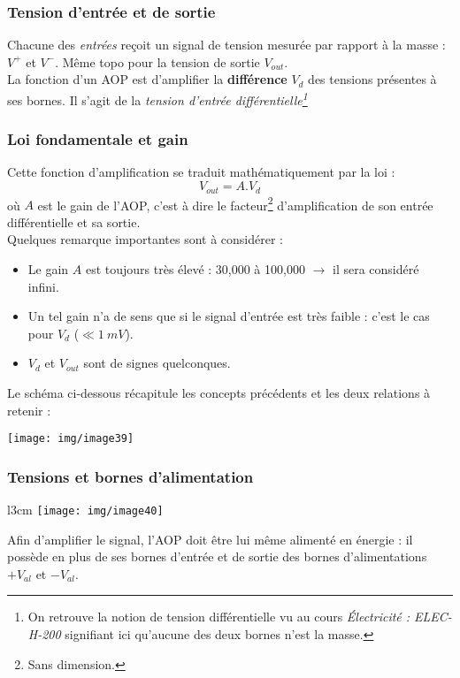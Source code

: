\subsubsection{Tension d'entrée et de sortie}
Chacune des \textit{entrées} reçoit un signal de tension mesurée par rapport à la masse : $V^+$ et $V^-$. Même topo pour la tension de sortie $V_{out}$.\\
La fonction d'un AOP est d'amplifier la \textbf{différence} $V_d$ des tensions présentes à ses bornes. Il s'agit de la \textit{tension d'entrée différentielle\footnote{On retrouve la notion de tension différentielle vu au cours \textit{Électricité : ELEC-H-200} signifiant ici qu'aucune des deux bornes n'est la masse.}}

\subsubsection{Loi fondamentale et gain}
Cette fonction d'amplification se traduit mathématiquement par la loi : 
\begin{equation}
V_{out} = A.V_d
\end{equation}
où $A$ est le gain de l'AOP, c'est à dire le facteur\footnote{Sans dimension.} d'amplification de son entrée différentielle et sa sortie.\\
Quelques remarque importantes sont à considérer :
\begin{itemize}
\item Le gain $A$ est toujours très élevé : 30,000 à 100,000 $\rightarrow$ il sera considéré infini.
\item Un tel gain n'a de sens que si le signal d'entrée est très faible : c'est le cas pour $V_d$ ($\ll 1\ mV$).
\item $V_d$ et $V_{out}$ sont de signes quelconques.
\end{itemize}
Le schéma ci-dessous récapitule les concepts précédents et les deux relations à retenir :
\begin{center}
\texttt{[image: img/image39]}
\end{center}


\subsubsection{Tensions et bornes d'alimentation}
\begin{wrapfigure}[8]{l}{3cm}
\texttt{[image: img/image40]}
\end{wrapfigure}
Afin d'amplifier le signal, l'AOP doit être lui même alimenté en énergie : il possède en plus de ses bornes d'entrée et de sortie des bornes d'alimentations $+V_{al}$ et $-V_{al}$. \\

